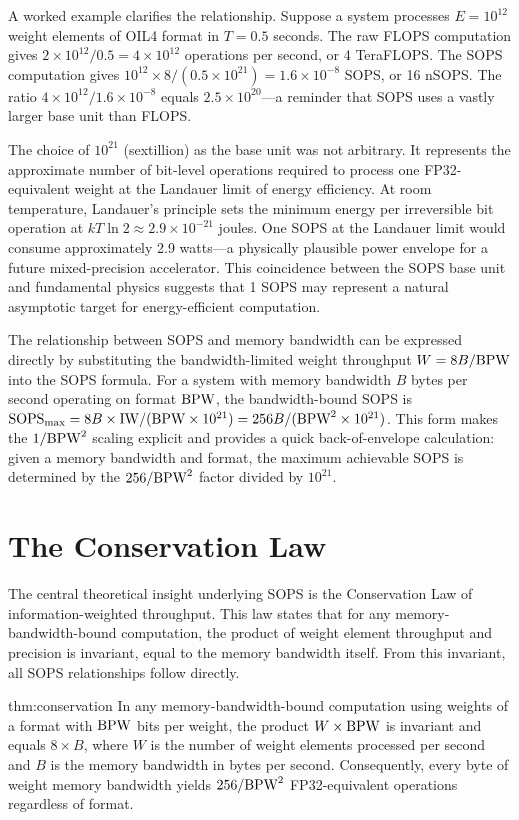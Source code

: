 A worked example clarifies the relationship. Suppose a system processes $E = 10^{12}$ weight elements of OIL4 format in $T = 0.5$ seconds. The raw FLOPS computation gives $2 \times 10^{12} / 0.5 = 4 \times 10^{12}$ operations per second, or 4 TeraFLOPS. The SOPS computation gives $10^{12} \times 8 / (0.5 \times 10^{21}) = 1.6 \times 10^{-8}$ SOPS, or 16 nSOPS. The ratio $4 \times 10^{12} / 1.6 \times 10^{-8}$ equals $2.5 \times 10^{20}$---a reminder that SOPS uses a vastly larger base unit than FLOPS.

The choice of $10^{21}$ (sextillion) as the base unit was not arbitrary. It represents the approximate number of bit-level operations required to process one FP32-equivalent weight at the Landauer limit of energy efficiency. At room temperature, Landauer's principle sets the minimum energy per irreversible bit operation at $kT \ln 2 \approx 2.9 \times 10^{-21}$ joules. One SOPS at the Landauer limit would consume approximately 2.9 watts---a physically plausible power envelope for a future mixed-precision accelerator. This coincidence between the SOPS base unit and fundamental physics suggests that 1 SOPS may represent a natural asymptotic target for energy-efficient computation.

The relationship between SOPS and memory bandwidth can be expressed directly by substituting the bandwidth-limited weight throughput $W = 8B / \textnormal{BPW}$ into the SOPS formula. For a system with memory bandwidth $B$ bytes per second operating on format $\textnormal{BPW}$, the bandwidth-bound SOPS is $\text{SOPS}_{\text{max}} = 8B \times \mathrm{IW} / (\textnormal{BPW} \times 10^{21}) = 256B / (\textnormal{BPW}^2 \times 10^{21})$. This form makes the $1/\textnormal{BPW}^2$ scaling explicit and provides a quick back-of-envelope calculation: given a memory bandwidth and format, the maximum achievable SOPS is determined by the $256 / \textnormal{BPW}^2$ factor divided by $10^{21}$.

\section{The Conservation Law}
\label{sec:conservation_law}

The central theoretical insight underlying SOPS is the Conservation Law of information-weighted throughput. This law states that for any memory-bandwidth-bound computation, the product of weight element throughput and precision is invariant, equal to the memory bandwidth itself. From this invariant, all SOPS relationships follow directly.

\begin{mythm}{thm:conservation}
In any memory-bandwidth-bound computation using weights of a format with $\textnormal{BPW}$ bits per weight, the product $W \times \textnormal{BPW}$ is invariant and equals $8 \times B$, where $W$ is the number of weight elements processed per second and $B$ is the memory bandwidth in bytes per second. Consequently, every byte of weight memory bandwidth yields $256 / \textnormal{BPW}^2$ FP32-equivalent operations regardless of format.
\end{mythm}

